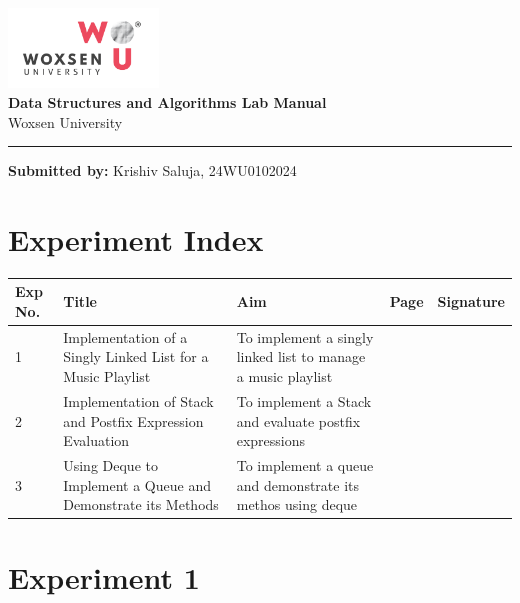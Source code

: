 \documentclass[a4paper,12pt]{article}
\begin{document}
\begin{titlepage}
    \centering
        \vspace*{2cm}
        \includegraphics[width=4cm]{woxsen_logo.png}\\[1cm]
        \Huge \textbf{Data Structures and Algorithms Lab Manual}\\[1cm]
        \Large Woxsen University\\[0.5cm]
\vspace*{\fill}
\noindent\rule{\textwidth}{1pt}
\vspace{0.5cm}
\begin{flushleft}
    \small \textbf{Submitted by:} Krishiv Saluja, 24WU0102024
\end{flushleft}
\end{titlepage}


\section*{Experiment Index}
\begin{tabular}{|p{1cm}|p{5cm}|p{5cm}|p{1cm}|p{2cm}|}
    \hline
    \textbf{Exp No.} & \textbf{Title} & \textbf{Aim} & \textbf{Page} & \textbf{Signature} \\
    \hline
    1 & Implementation of a Singly Linked List for a Music Playlist & To implement a singly linked list to manage a music playlist & \pageref{sec:exp1} & \\
    \hline
    2 & Implementation of Stack and Postfix Expression Evaluation & To implement a Stack and evaluate postfix expressions & \pageref{sec:exp2} & \\
    \hline
    3 & Using Deque to Implement a Queue and Demonstrate its Methods & To implement a queue and demonstrate its methos using deque & \pageref{sec:exp3} &\\
    \hline
\end{tabular}
\clearpage

\section*{ Experiment 1}
\label{sec:exp1}
\end{document}
